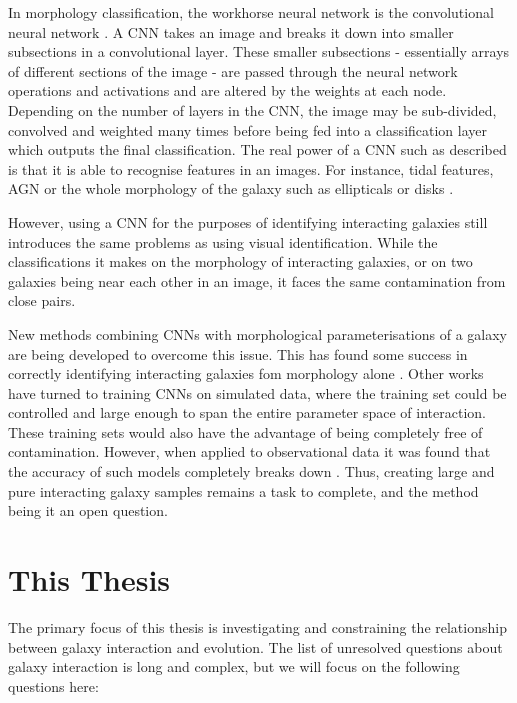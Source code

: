 In morphology classification, the workhorse neural network is the convolutional neural network \citep[CNN; examples include][]{2010MNRAS.406..342B, 2015ApJS..221....8H, 2020MNRAS.491.1554W, 2023ApJ...944..124T}. A CNN takes an image and breaks it down into smaller subsections in a convolutional layer. These smaller subsections - essentially arrays of different sections of the image - are passed through the neural network operations and activations and are altered by the weights at each node. Depending on the number of layers in the CNN, the image may be sub-divided, convolved and weighted many times before being fed into a classification layer which outputs the final classification. The real power of a CNN such as described is that it is able to recognise features in an images. For instance, tidal features, AGN or the whole morphology of the galaxy such as ellipticals or disks \citep[e.g][]{2018MNRAS.479..415A,2020ApJ...895..112G, 2022MNRAS.511.3330T, 2023ApJ...944..124T}. 

However, using a CNN for the purposes of identifying interacting galaxies still introduces the same problems as using visual identification. While the classifications it makes on the morphology of interacting galaxies, or on two galaxies being near each other in an image, it faces the same contamination from close pairs.

New methods combining CNNs with morphological parameterisations of a galaxy are being developed to overcome this issue. This has found some success in correctly identifying interacting galaxies fom morphology alone \citep{2023ApJ...958...96R}. Other works have turned to training CNNs on simulated data, where the training set could be controlled and large enough to span the entire parameter space of interaction. These training sets would also have the advantage of being completely free of contamination. However, when applied to observational data it was found that the accuracy of such models completely breaks down \citep{2019MNRAS.490.5390B, 2020A&C....3200390C}. Thus, creating large and pure interacting galaxy samples remains a task to complete, and the method being it an open question.

\section{This Thesis}
\noindent The primary focus of this thesis is investigating and constraining the relationship between galaxy interaction and evolution. The list of unresolved questions about galaxy interaction is long and complex, but we will focus on the following questions here:

